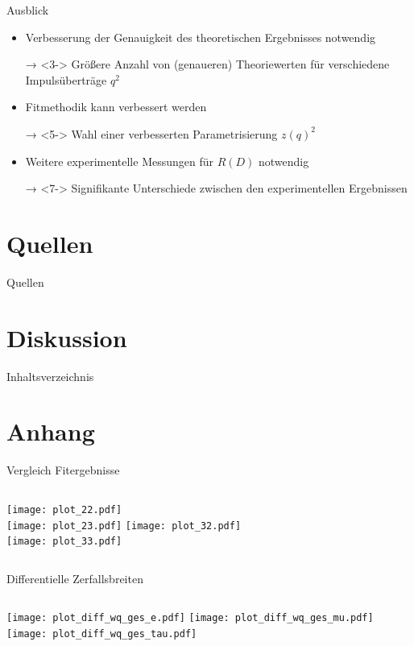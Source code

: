 \documentclass[fleqn, aspectratio=1610, professionalfonts, 9pt]{beamer}
\begin{document}
\begin{frame}{Ausblick}
  \begin{itemize}
    \setlength\itemsep{1em}
    \item<2-> Verbesserung der Genauigkeit des theoretischen Ergebnisses notwendig
    \item[→]<3-> Größere Anzahl von (genaueren) Theoriewerten für verschiedene Impulsüberträge $q^2$
    \item<4-> Fitmethodik kann verbessert werden
    \item[→]<5-> Wahl einer verbesserten Parametrisierung $z(q)^2$
    \item<6-> Weitere experimentelle Messungen für $R(D)$ notwendig
    \item[→]<7-> Signifikante Unterschiede zwischen den experimentellen Ergebnissen

  \end{itemize}
\end{frame}

\section{Quellen}

\begin{frame}{Quellen}
  \tableofcontents[currentsection,currentsubsection,
      hideothersubsections,
      sectionstyle=show/shaded,
  ]\end{frame}

\begin{frame}[allowframebreaks]
    \printbibliography
\end{frame}

\section{Diskussion}

\begin{frame}{Inhaltsverzeichnis}
  \tableofcontents[currentsection,currentsubsection,
      hideothersubsections,
      sectionstyle=show/shaded,
  ]\end{frame}



\appendix
\section{Anhang}


\begin{frame}{Vergleich Fitergebnisse}
  \begin{columns}[t]
    \centering
    \texttt{[image: plot\_22.pdf]}\\
    \texttt{[image: plot\_23.pdf]}
    \centering
    \texttt{[image: plot\_32.pdf]}\\
    \texttt{[image: plot\_33.pdf]}
  \end{columns}
\end{frame}

\begin{frame}{Differentielle Zerfallsbreiten}
  \begin{columns}[t]
    \column{\textwidth}
    \centering
    \texttt{[image: plot\_diff\_wq\_ges\_e.pdf]}
    \texttt{[image: plot\_diff\_wq\_ges\_mu.pdf]}
    \texttt{[image: plot\_diff\_wq\_ges\_tau.pdf]}
  \end{columns}
\end{frame}
\end{document}
